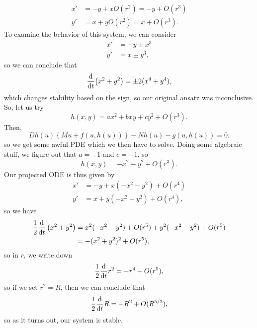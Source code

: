 \documentclass{article}
\begin{document}
        \begin{align*}
            x' &= -y + xO(r^2) = -y + O(r^3)\\
            y' &= x + yO(r^2) = x + O(r^3).
        \end{align*} 
        To examine the behavior of this system, we can consider 
        \begin{align*}
            x' &= -y \pm x^3 \\
            y' &= x \pm y^3,
        \end{align*}
        so we can conclude that 
        \begin{align*}
            \dv{t}(x^2 + y^2) = \pm2(x^4 + y^4),
        \end{align*}
        which changes stability based on the sign, so our original ansatz was inconclusive. So, let us try 
        \[
            h(x, y) = ax^2 + bxy + cy^2 + O(r^3). 
        \]
        Then, 
        \[
            Dh(u) \left\{Mu + f(u, h(u))\right\} - Nh(u) - g(u, h(u)) = 0.
        \]
        so we get some awful PDE which we then have to solve. Doing some algebraic stuff, we figure out that $a = -1$ and $c = -1$, so 
        \[
            h(x, y) = -x^2 -y^2 + O(r^3).
        \]
        Our projected ODE is thus given by 
        \begin{align*}
            x' &= -y + x(-x^2 - y^2) + O(r^4) \\
            y' &= x + y(-x^2 + y^2) + O(r^4),
        \end{align*}
        so we have 
        \begin{align*}
            \frac{1}{2} \dv{t} \left(x^2 + y^2\right) &= x^2 (-x^2 - y^2) + O(r^5) + y^2(-x^2 - y^2) + O(r^5) \\
            &= -(x^2 + y^2)^2 + O(r^5),
        \end{align*}
        so in $r$, we write down 
        \begin{align*}
            \frac{1}{2} \dv{t} r^2 = -r^4 + O(r^5),
        \end{align*}
        so if we set $r^2 = R$, then we can conclude that 
        \[
            \frac{1}{2} \dv{t} R = -R^2 + O(R^{5/2}),
        \]
        so as it turns out, our system is stable. 
\end{document}
